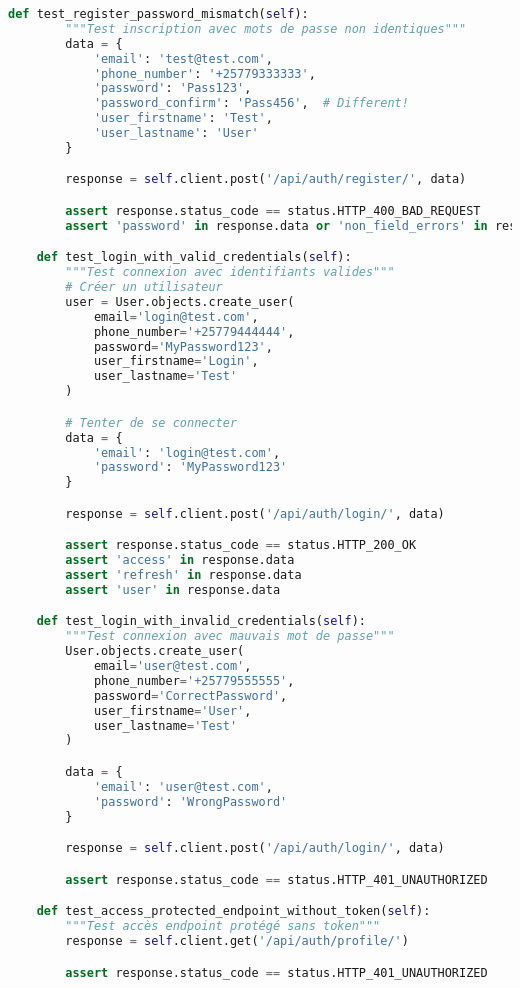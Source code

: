 \begin{lstlisting}[language=Python, caption=users/tests/test\_api.py]
    def test_register_password_mismatch(self):
        """Test inscription avec mots de passe non identiques"""
        data = {
            'email': 'test@test.com',
            'phone_number': '+25779333333',
            'password': 'Pass123',
            'password_confirm': 'Pass456',  # Different!
            'user_firstname': 'Test',
            'user_lastname': 'User'
        }

        response = self.client.post('/api/auth/register/', data)

        assert response.status_code == status.HTTP_400_BAD_REQUEST
        assert 'password' in response.data or 'non_field_errors' in response.data

    def test_login_with_valid_credentials(self):
        """Test connexion avec identifiants valides"""
        # Créer un utilisateur
        user = User.objects.create_user(
            email='login@test.com',
            phone_number='+25779444444',
            password='MyPassword123',
            user_firstname='Login',
            user_lastname='Test'
        )

        # Tenter de se connecter
        data = {
            'email': 'login@test.com',
            'password': 'MyPassword123'
        }

        response = self.client.post('/api/auth/login/', data)

        assert response.status_code == status.HTTP_200_OK
        assert 'access' in response.data
        assert 'refresh' in response.data
        assert 'user' in response.data

    def test_login_with_invalid_credentials(self):
        """Test connexion avec mauvais mot de passe"""
        User.objects.create_user(
            email='user@test.com',
            phone_number='+25779555555',
            password='CorrectPassword',
            user_firstname='User',
            user_lastname='Test'
        )

        data = {
            'email': 'user@test.com',
            'password': 'WrongPassword'
        }

        response = self.client.post('/api/auth/login/', data)

        assert response.status_code == status.HTTP_401_UNAUTHORIZED

    def test_access_protected_endpoint_without_token(self):
        """Test accès endpoint protégé sans token"""
        response = self.client.get('/api/auth/profile/')

        assert response.status_code == status.HTTP_401_UNAUTHORIZED


\end{lstlisting}
